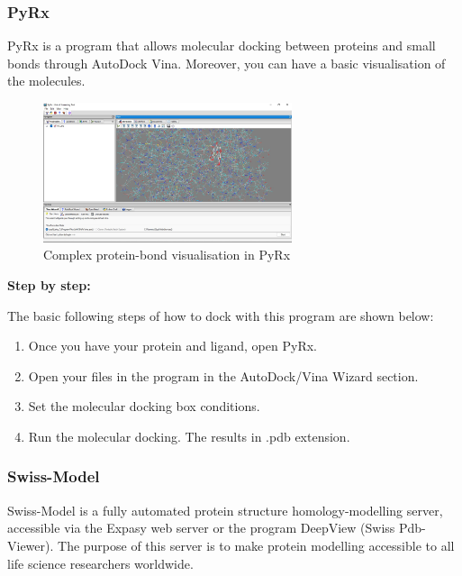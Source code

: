 \documentclass[11pt, letterpaper, english]{article}
\begin{document}
        \subsubsection{PyRx}
        \par PyRx is a program that allows molecular docking between proteins and small bonds through AutoDock Vina. Moreover, you can have a basic visualisation of the molecules.
       
\begin{figure}
	    \centering
		\caption{Complex protein-bond visualisation in PyRx  \cite{Dallakyan_2014}}
		\includegraphics[width=0.65\textwidth]{pyrx.jpg}
	\end{figure}
	
    \par{\textbf{Step by step:}}
    \par{The basic following steps of how to dock with this program are shown below:}
            \begin{enumerate}[1.]
            \item Once you have your protein and ligand, open PyRx.
            \item Open your files in the program in the AutoDock/Vina Wizard section.
            \item Set the molecular docking box conditions.
            \item Run the molecular docking.
            \iteclickve The results in .pdb extension.
            \end{enumerate}

        \subsubsection{Swiss-Model}
        \par Swiss-Model is a fully automated protein structure homology-modelling server, accessible via the Expasy web server or the program DeepView (Swiss Pdb-Viewer). The purpose of this server is to make protein modelling accessible to all life science researchers worldwide.
        
\end{document}
